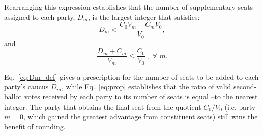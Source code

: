 \documentclass[DIV=calc, paper=a4, fontsize=11pt, twocolumn]{scrartcl}	 %
\begin{document}
Rearranging this expression establishes that the number of supplementary seats assigned to each party, $D_m$, is the largest integer that satisfies:
\begin{equation}
\label{eq:Dm_def}
D_m < \frac{ C_0 V_m - C_m V_0}{V_0},
\end{equation}
and
\begin{equation}
\label{eq:prop}
\frac{D_{m}+C_m}{V_{m}} \le \frac{C_0}{V_0} \, , \,\, \forall \,\, m. 
\end{equation}

Eq.~\ref{eq:Dm_def} gives a prescription for the number of seats to be added to each party's caucus $D_m$, while Eq.~\ref{eq:prop} establishes that the ratio of valid second-ballot votes received by each party to its number of seats is equal \---to the nearest integer. The party that obtains the final seat from the quotient $C_0/V_0$ (i.e. party $m=0$, which gained the greatest advantage from constituent seats) still wins the benefit of rounding.
\end{document}

